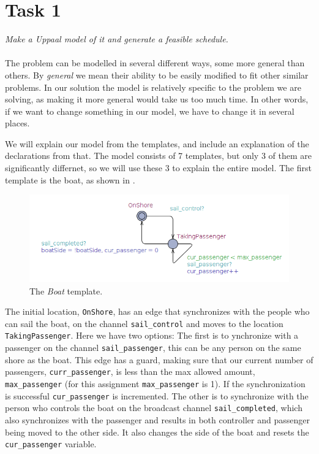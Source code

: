 \section{Task 1}
\label{sec:task1}
\textit{Make a Uppaal model of it and generate a feasible schedule.}\\\\
The problem can be modelled in several different ways, some more general than others. By \textit{general} we mean their ability to be easily modified to fit other similar problems. In our solution the model is relatively specific to the problem we are solving, as making it more general would take us too much time. In other words, if we want to change something in our model, we have to change it in several places.

We will explain our model from the templates, and include an explanation of the declarations from that. The model consists of 7 templates, but only 3 of them are significantly differnet, so we will use these 3 to explain the entire model. The first template is the boat, as shown in .

\begin{figure}[H] \centering
	\includegraphics[width=1\textwidth]{Images/boat.png}
	\caption{The \textit{Boat} template.}\label{fig:boat}
\end{figure} 

\noindent The initial location, \texttt{OnShore}, has an edge that synchronizes with the people who can sail the boat, on the channel \texttt{sail_control} and moves to the location \texttt{TakingPassenger}. Here we have two options: The first is to ynchronize with a passenger on the channel \texttt{sail_passenger}, this can be any person on the same shore as the boat. This edge has a guard, making sure that our current number of passengers, \texttt{curr_passenger}, is less than the max allowed amount, \texttt{max_passenger} (for this assignment \texttt{max_passenger} is 1). If the synchronization is successful \texttt{cur_passenger} is incremented. The other is to synchronize with the person who controls the boat on the broadcast channel \texttt{sail_completed}, which also synchronizes with the passenger and results in both controller and passenger being moved to the other side. It also changes the side of the boat and resets the \texttt{cur_passenger} variable.

